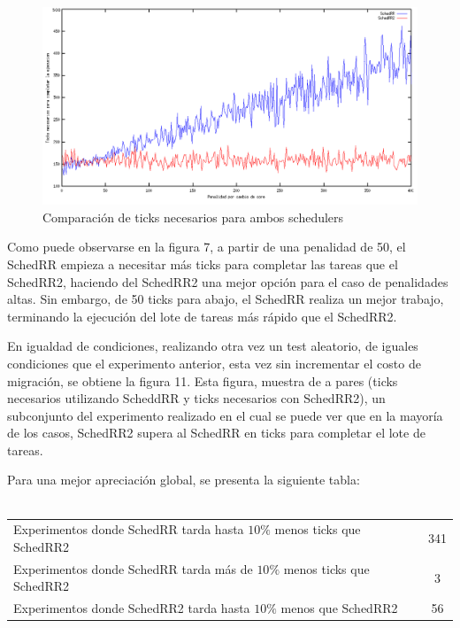 \documentclass[a4paper,10pt,twoside]{article}
\begin{document}
\begin{figure}[ht!]
\centering
\includegraphics[width=175mm]{../ejercicio8/compTicksSched.png}
\caption{Comparación de ticks necesarios para ambos schedulers}
\label{overflow}
\end{figure}

Como puede observarse en la figura 7, a partir de una penalidad de 50, el SchedRR empieza a necesitar más ticks para completar las tareas que el SchedRR2, haciendo del SchedRR2 una mejor opción para el caso de penalidades altas. Sin embargo, de 50 ticks para abajo, el SchedRR realiza un mejor trabajo, terminando la ejecución del lote de tareas más rápido que el SchedRR2.

En igualdad de condiciones, realizando otra vez un test aleatorio, de iguales condiciones que el experimento anterior, esta vez sin incrementar el costo de migración, se obtiene la figura 11. Esta figura, muestra de a pares (ticks necesarios utilizando ScheddRR y ticks necesarios con SchedRR2), un subconjunto del experimento realizado en el cual se puede ver que en la mayoría de los casos, SchedRR2 supera al SchedRR en ticks para completar el lote de tareas.

Para una mejor apreciación global, se presenta la siguiente tabla: \\
\\
\begin{tabular}{| l | c |}
  \hline                        
  Experimentos donde SchedRR tarda hasta $10\%$ menos ticks que SchedRR2 & 341 \\
  Experimentos donde SchedRR tarda más de $10\%$ menos ticks que SchedRR2 & 3 \\
  Experimentos donde SchedRR2 tarda hasta $10\%$ menos que SchedRR2 & 56 \\
  \hline  
\end{tabular}
\end{document}

